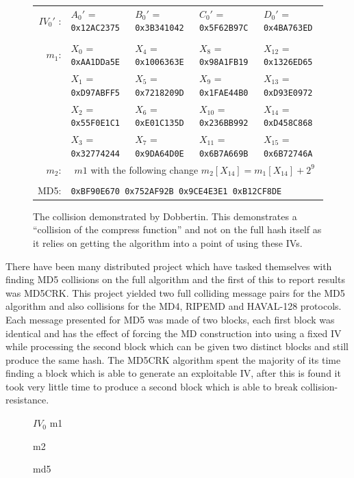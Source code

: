 \documentclass[a4paper,12pt]{article}
\begin{document}
\begin{figure}
\begin{tabular}{|r|  l l l l|}
	$IV_0'$ :& $A_0'$ = \texttt{0x12AC2375}& $B_0'$ = \texttt{0x3B341042}& $C_0'$ = \texttt{0x5F62B97C}& $D_0'$ = \texttt{0x4BA763ED}\\& & & &\\
	$m_1$:& $X_0$ = \texttt{0xAA1DDa5E} & $X_4$ = \texttt{0x1006363E} & $X_8$ = \texttt{0x98A1FB19} & $X_{12}$ = \texttt{0x1326ED65} \\
	& $X_1$ = \texttt{0xD97ABFF5} & $X_5$ = \texttt{0x7218209D} & $X_9$ = \texttt{0x1FAE44B0} & $X_{13}$ = \texttt{0xD93E0972} \\
	& $X_2$ = \texttt{0x55F0E1C1} & $X_6$ = \texttt{0xE01C135D} & $X_{10}$ = \texttt{0x236BB992} & $X_{14}$ = \texttt{0xD458C868} \\
	& $X_3$ = \texttt{0x32774244} & $X_7$ = \texttt{0x9DA64D0E} & $X_{11}$ = \texttt{0x6B7A669B} & $X_{15}$ = \texttt{0x6B72746A} \\
	$m_2$: & \multicolumn{4}{c|}{$m1$ with the following change $m_2[X_{14}] = m_1[X_{14}] + 2^9$ }\\& & & &\\
	MD5: & \multicolumn{4}{l|}{\texttt{0xBF90E670 0x752AF92B 0x9CE4E3E1 0xB12CF8DE}}
\end{tabular}
\caption{The collision demonstrated by Dobbertin\cite{dobbertin}. This demonstrates a ``collision of the compress function'' and not on the full hash itself as it relies on getting the algorithm into a point of using these IVs.}

\end{figure}

There have been many distributed project which have tasked themselves with finding MD5 collisions on the full algorithm and the first of this to report results was MD5CRK\cite{cryptoeprint:2004:199}. This project yielded two full colliding message pairs for the MD5 algorithm and also collisions for the MD4, RIPEMD and HAVAL-128 protocols. Each message presented for MD5 was made of two blocks, each first block was identical and has the effect of forcing the MD construction into using a fixed IV while processing the second block which can be given two distinct blocks and still produce the same hash. The MD5CRK algorithm spent the majority of its time finding a block which is able to generate an exploitable IV, after this is found it took very little time to produce a second block which is able to break collision-resistance.
\begin{figure}
	$IV_0$
	m1

	m2

	md5
\caption{}
\end{figure}
\end{document}
